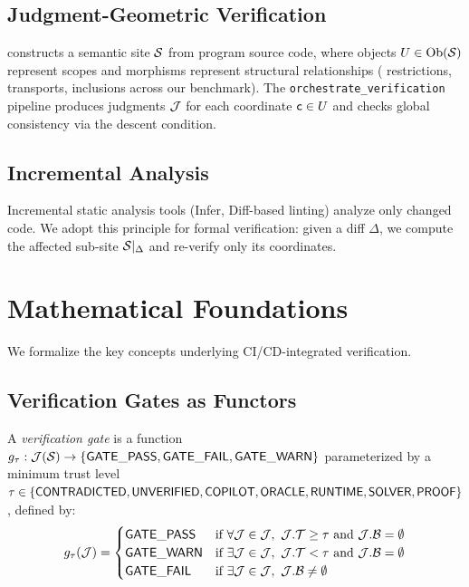 \documentclass[11pt]{article}
\newcommand{\GatePass}{\mathsf{GATE\_PASS}}
\newcommand{\GateFail}{\mathsf{GATE\_FAIL}}
\newcommand{\GateWarn}{\mathsf{GATE\_WARN}}
\begin{document}
\subsection{Judgment-Geometric Verification}

\JuGeo{} constructs a semantic site $\mathcal{S}$ from program source code, where
objects $U \in \mathrm{Ob}(\mathcal{S})$ represent scopes and morphisms represent structural
relationships (\compMorphRestriction{} restrictions, \compMorphTransport{}
transports, \compMorphInclusion{} inclusions across our benchmark). The
\texttt{orchestrate\_verification} pipeline produces judgments $\mathcal{J}$ for each
coordinate $\mathsf{c} \in U$ and checks global consistency via the descent
condition.

\subsection{Incremental Analysis}

Incremental static analysis tools (Infer, Diff-based linting) analyze only
changed code. We adopt this principle for formal verification: given a diff
$\Delta$, we compute the affected sub-site $\mathcal{S}|_\Delta$ and re-verify only
its coordinates.

\section{Mathematical Foundations}\label{sec:math-foundations}

We formalize the key concepts underlying CI/CD-integrated verification.

\subsection{Verification Gates as Functors}

\begin{definition}
A \emph{verification gate} is a function $g_\tau : \mathcal{J}(\Site) \to
\{\GatePass, \GateFail, \GateWarn\}$ parameterized by a minimum trust level
$\tau \in \{\mathsf{CONTRADICTED}, \mathsf{UNVERIFIED}, \mathsf{COPILOT}, \mathsf{ORACLE}, \mathsf{RUNTIME}, \mathsf{SOLVER},
\mathsf{PROOF}\}$, defined by:
\[
  g_\tau(\mathcal{J}) = \begin{cases}
    \GatePass & \text{if } \forall \J \in \mathcal{J},\ \J.\trust \geq \tau
      \text{ and } \J.\obstr = \emptyset \\
    \GateWarn & \text{if } \exists \J \in \mathcal{J},\ \J.\trust < \tau
      \text{ and } \J.\obstr = \emptyset \\
    \GateFail & \text{if } \exists \J \in \mathcal{J},\ \J.\obstr \neq \emptyset
  \end{cases}
\]
\end{definition}
\end{document}
